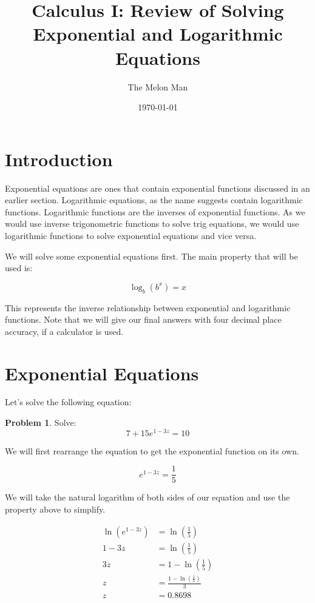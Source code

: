 \documentclass[12pt]{article}
\title{Calculus I: Review of Solving Exponential and Logarithmic Equations}
\author{The Melon Man}
\date{\today}
\theoremstyle{definition}
\newtheorem{problem}{Problem}
\begin{document}
\maketitle

\section{Introduction}
Exponential equations are ones that contain exponential functions discussed in an earlier section.
Logarithmic equations, as the name suggests contain logarithmic functions.
Logarithmic functions are the inverses of exponential functions.
As we would use inverse trigonometric functions to solve trig equations, we would use logarithmic functions to solve exponential equations and vice versa.

We will solve some exponential equations first.
The main property that will be used is:

\begin{equation}
    \log_b(b^x) = x
\end{equation}

This represents the inverse relationship between exponential and logarithmic functions.
Note that we will give our final answers with four decimal place accuracy, if a calculator is used.

\section{Exponential Equations}
Let's solve the following equation:

\begin{problem}
Solve:
\begin{equation*}
    7 + 15e^{1-3z} = 10 \label{eq:1}
\end{equation*}
\end{problem}

We will first rearrange the equation to get the exponential function on its own.

\begin{equation}
    e^{1-3z} = \frac{1}{5}
\end{equation}

We will take the natural logarithm of both sides of our equation and use the property above to simplify.

\begin{align}
    \ln(e^{1-3z}) & = \ln\left(\frac{1}{5}\right)             \\
    1-3z          & = \ln\left(\frac{1}{5}\right)             \\
    3z            & = 1-\ln\left(\frac{1}{5}\right)           \\
    z             & = \frac{1-\ln\left(\frac{1}{5}\right)}{3} \\
    z             & = 0.8698
\end{align}
\end{document}
